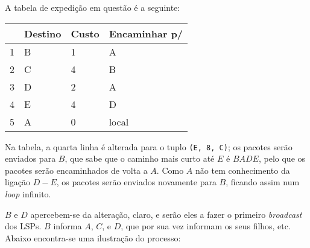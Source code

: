 \begin{enumerate}[leftmargin=\labelsep]
        \begin{figure}[H]
          \centering
          
        \end{figure}

        A tabela de expedição em questão é a seguinte:

        \begin{table}[H]
          \centering
          \begin{tabular}{l|l|l|l}
              & Destino & Custo & Encaminhar p/ \\ \hline
            1 & B       & 1     & A             \\
            2 & C       & 4     & B             \\
            3 & D       & 2     & A             \\
            4 & E       & 4     & D             \\
            5 & A       & 0     & local
          \end{tabular}
        \end{table}


        Na tabela, a quarta linha é alterada para o tuplo \texttt{(E, 8, C)}; os pacotes
        serão enviados para $B$, que sabe que o caminho mais curto até $E$ é $BADE$,
        pelo que os pacotes serão encaminhados de volta a $A$. Como $A$ não tem conhecimento
        da ligação $D-E$, os pacotes serão enviados novamente para $B$, ficando
        assim num \textit{loop} infinito.


        $B$ e $D$ apercebem-se da alteração, claro, e serão eles a fazer o primeiro
        \textit{broadcast} dos LSPs. $B$ informa $A$, $C$, e $D$, que por sua vez informam
        os seus filhos, etc. Abaixo encontra-se uma ilustração do processo:

        \begin{figure}[H]
          \centering
          
        \end{figure}

\end{enumerate}